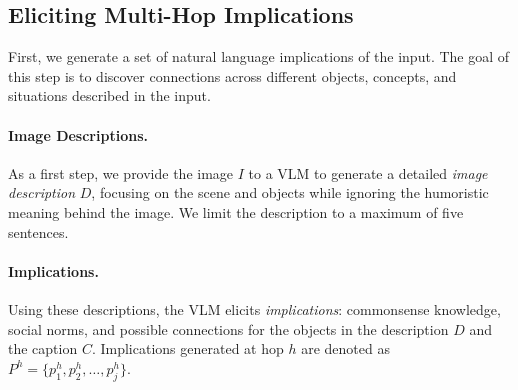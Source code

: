




\subsection{Eliciting Multi-Hop Implications} 
\label{sec:method:gen_imps}

First, we generate a set of natural language implications of the input.
The goal of this step is to discover connections across different objects, concepts, and situations described in the input.

\paragraph{Image Descriptions.} 
As a first step, we provide the image $I$ to a VLM to generate a detailed \textit{image description} $D$, focusing on the scene and objects while ignoring the humoristic meaning behind the image. We limit the description to a maximum of five sentences. 

\paragraph{Implications.} 
Using these descriptions, the VLM elicits \textit{implications}: commonsense knowledge, social norms, and possible connections for the objects in the description $D$ and the caption $C$. Implications generated at hop $h$ are denoted as $P^{h} = \{ p_1^{h}, p_2^{h}, \dots, p_j^{h} \}$.

